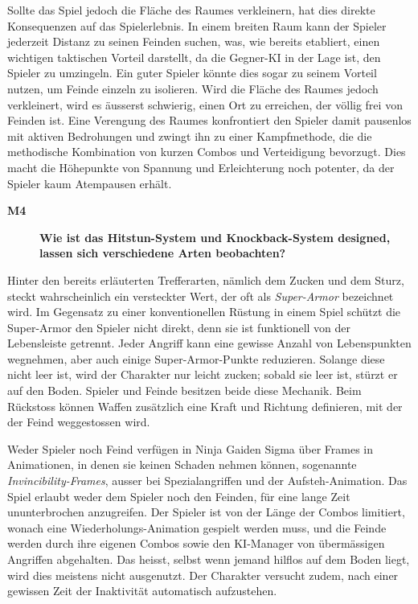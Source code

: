 \documentclass[../Main.tex]{subfiles}
\begin{document}
Sollte das Spiel jedoch die Fläche des Raumes verkleinern, hat dies direkte Konsequenzen auf das Spielerlebnis. In einem breiten Raum kann der Spieler jederzeit Distanz zu seinen Feinden suchen, was, wie bereits etabliert, einen wichtigen taktischen Vorteil darstellt, da die Gegner-KI in der Lage ist, den Spieler zu umzingeln. Ein guter Spieler könnte dies sogar zu seinem Vorteil nutzen, um Feinde einzeln zu isolieren. Wird die Fläche des Raumes jedoch verkleinert, wird es äusserst schwierig, einen Ort zu erreichen, der völlig frei von Feinden ist. Eine Verengung des Raumes konfrontiert den Spieler damit pausenlos mit aktiven Bedrohungen und zwingt ihn zu einer Kampfmethode, die die methodische Kombination von kurzen Combos und Verteidigung bevorzugt. Dies macht die Höhepunkte von Spannung und Erleichterung noch potenter, da der Spieler kaum Atempausen erhält.

\begin{description}
  \item[\textbf{M4}] \textbf{Wie ist das Hitstun-System und Knockback-System designed, lassen sich verschiedene Arten beobachten?}
\end{description}

Hinter den bereits erläuterten Trefferarten, nämlich dem Zucken und dem Sturz, steckt wahrscheinlich ein versteckter Wert, der oft als \textit{Super-Armor} bezeichnet wird. Im Gegensatz zu einer konventionellen Rüstung in einem Spiel schützt die Super-Armor den Spieler nicht direkt, denn sie ist funktionell von der Lebensleiste getrennt. Jeder Angriff kann eine gewisse Anzahl von Lebenspunkten wegnehmen, aber auch einige Super-Armor-Punkte reduzieren. Solange diese nicht leer ist, wird der Charakter nur leicht zucken; sobald sie leer ist, stürzt er auf den Boden. Spieler und Feinde besitzen beide diese Mechanik. Beim Rückstoss können Waffen zusätzlich eine Kraft und Richtung definieren, mit der der Feind weggestossen wird.

Weder Spieler noch Feind verfügen in Ninja Gaiden Sigma über Frames in Animationen, in denen sie keinen Schaden nehmen können, sogenannte \textit{Invincibility-Frames}, ausser bei Spezialangriffen und der Aufsteh-Animation. Das Spiel erlaubt weder dem Spieler noch den Feinden, für eine lange Zeit ununterbrochen anzugreifen. Der Spieler ist von der Länge der Combos limitiert, wonach eine Wiederholungs-Animation gespielt werden muss, und die Feinde werden durch ihre eigenen Combos sowie den KI-Manager von übermässigen Angriffen abgehalten. Das heisst, selbst wenn jemand hilflos auf dem Boden liegt, wird dies meistens nicht ausgenutzt. Der Charakter versucht zudem, nach einer gewissen Zeit der Inaktivität automatisch aufzustehen.
\end{document}
